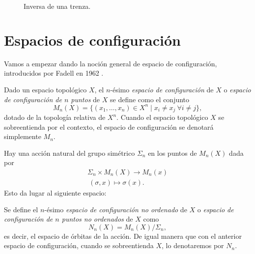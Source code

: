 \documentclass[TFG.tex]{subfiles}
\begin{document}

\begin{figure}[h!]
\caption{Inversa de una trenza.}\label{especular}
\end{figure}


\section{Espacios de configuración}
Vamos a empezar dando la noción general de espacio de configuración, introducidos por Fadell en 1962 \cite{Fadell}.
\begin{defi}
Dado un espacio topológico $X$, el $n$-ésimo \emph{espacio de configuración} de $X$ o \emph{espacio de configuración de $n$ puntos} de $X$ se define como el conjunto
$$M_n(X)=\{(x_1,\dots,x_n)\in X^n\mid x_i\neq x_j\ \forall i\neq j\},$$
dotado de la topología relativa de $X^n$. Cuando el espacio topológico $X$ se sobreentienda por el contexto, el espacio de configuración se denotará simplemente $M_n$. 
\end{defi}

Hay una acción natural del grupo simétrico $\Sigma_n$ en los puntos de $M_n(X)$ dada por 
\begin{gather*}
\Sigma_n\times M_n(X)\to M_n(x)\\
\ (\sigma,x)\mapsto \sigma(x).
\end{gather*}
Esto da lugar al siguiente espacio:
\begin{defi}
Se define el $n$-ésimo \emph{espacio de configuración no ordenado} de $X$ o \emph{espacio de configuración de $n$ puntos no ordenados} de $X$ como 
$$N_n(X)=M_n(X)/\Sigma_n,$$
es decir, el espacio de órbitas de la acción. De igual manera que con el anterior espacio de configuración, cuando se sobreentienda $X$, lo denotaremos por $N_n$. 
\end{defi}
\end{document}
